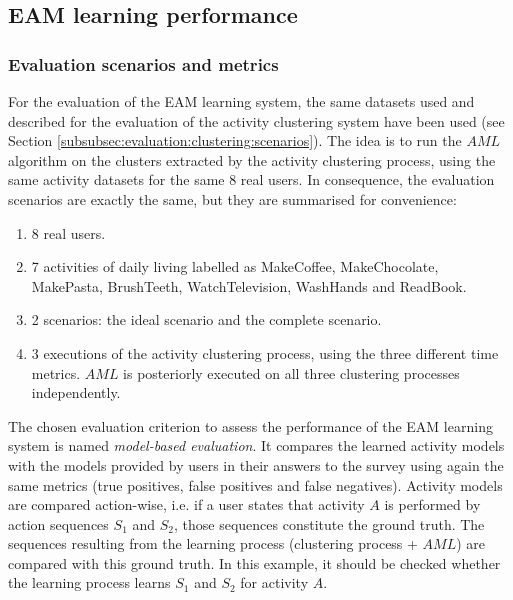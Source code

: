\subsection{EAM learning performance}
\label{subsec:evaluation:eam}

\subsubsection{Evaluation scenarios and metrics}
\label{subsubsec:evaluation:eam:scenarios}

For the evaluation of the EAM learning system, the same datasets used and described for the evaluation of the activity clustering system have been used (see Section \ref{subsubsec:evaluation:clustering:scenarios}). The idea is to run the $AML$ algorithm on the clusters extracted by the activity clustering process, using the same activity datasets for the same 8 real users. In consequence, the evaluation scenarios are exactly the same, but they are summarised for convenience:

\begin{enumerate}
 \item 8 real users.
 \item 7 activities of daily living labelled as MakeCoffee, MakeChocolate, MakePasta, BrushTeeth, WatchTelevision, WashHands and ReadBook. 
 \item 2 scenarios: the ideal scenario and the complete scenario.
 \item 3 executions of the activity clustering process, using the three different time metrics. $AML$ is posteriorly executed on all three clustering processes independently.
\end{enumerate}

The chosen evaluation criterion to assess the performance of the EAM learning system is named \textit{model-based evaluation}. It compares the learned activity models with the models provided by users in their answers to the survey using again the same metrics (true positives, false positives and false negatives). Activity models are compared action-wise, i.e. if a user states that activity $A$ is performed by action sequences $S_1$ and $S_2$, those sequences constitute the ground truth. The sequences resulting from the learning process (clustering process + $AML$) are compared with this ground truth. In this example, it should be checked whether the learning process learns $S_1$ and $S_2$ for activity $A$.

